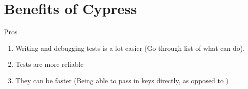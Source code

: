 \maketitle{}
\section{ Benefits of Cypress }

Pros
\begin{enumerate}
  \item Writing and debugging tests is a lot easier (Go through list of what
  can do).
  \item Tests are more reliable
  \item They can be faster (Being able to pass in keys directly, as opposed to
  )
\end{enumerate}
